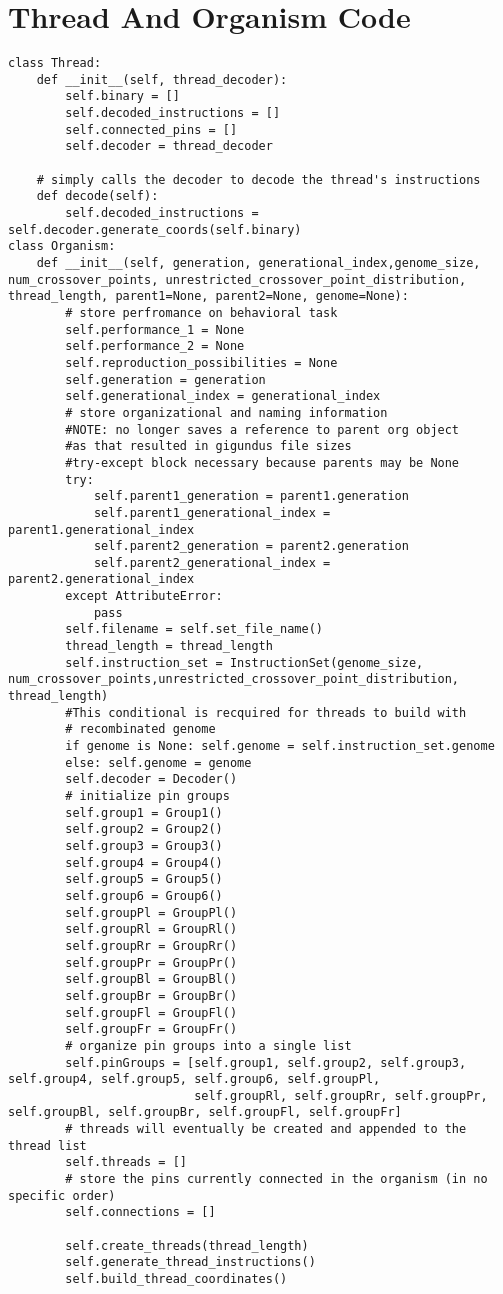 \documentclass[a4paper]{article}
\begin{document}
\section{Thread And Organism Code}
\label{sec-7}
\begin{verbatim}
class Thread:
    def __init__(self, thread_decoder):
        self.binary = []
        self.decoded_instructions = []
        self.connected_pins = []
        self.decoder = thread_decoder

    # simply calls the decoder to decode the thread's instructions
    def decode(self):
        self.decoded_instructions = self.decoder.generate_coords(self.binary)
class Organism:
    def __init__(self, generation, generational_index,genome_size, num_crossover_points, unrestricted_crossover_point_distribution, thread_length, parent1=None, parent2=None, genome=None):
        # store perfromance on behavioral task
        self.performance_1 = None
        self.performance_2 = None
        self.reproduction_possibilities = None
        self.generation = generation
        self.generational_index = generational_index
        # store organizational and naming information
        #NOTE: no longer saves a reference to parent org object
        #as that resulted in gigundus file sizes
        #try-except block necessary because parents may be None
        try:
            self.parent1_generation = parent1.generation
            self.parent1_generational_index = parent1.generational_index
            self.parent2_generation = parent2.generation
            self.parent2_generational_index = parent2.generational_index
        except AttributeError:
            pass
        self.filename = self.set_file_name()
        thread_length = thread_length
        self.instruction_set = InstructionSet(genome_size, num_crossover_points,unrestricted_crossover_point_distribution, thread_length)
        #This conditional is recquired for threads to build with
        # recombinated genome
        if genome is None: self.genome = self.instruction_set.genome
        else: self.genome = genome
        self.decoder = Decoder()
        # initialize pin groups
        self.group1 = Group1()
        self.group2 = Group2()
        self.group3 = Group3()
        self.group4 = Group4()
        self.group5 = Group5()
        self.group6 = Group6()
        self.groupPl = GroupPl()
        self.groupRl = GroupRl()
        self.groupRr = GroupRr()
        self.groupPr = GroupPr()
        self.groupBl = GroupBl()
        self.groupBr = GroupBr()
        self.groupFl = GroupFl()
        self.groupFr = GroupFr()
        # organize pin groups into a single list
        self.pinGroups = [self.group1, self.group2, self.group3, self.group4, self.group5, self.group6, self.groupPl,
                          self.groupRl, self.groupRr, self.groupPr, self.groupBl, self.groupBr, self.groupFl, self.groupFr]
        # threads will eventually be created and appended to the thread list
        self.threads = []
        # store the pins currently connected in the organism (in no specific order)
        self.connections = []

        self.create_threads(thread_length)
        self.generate_thread_instructions()
        self.build_thread_coordinates()
\end{verbatim}
\end{document}
